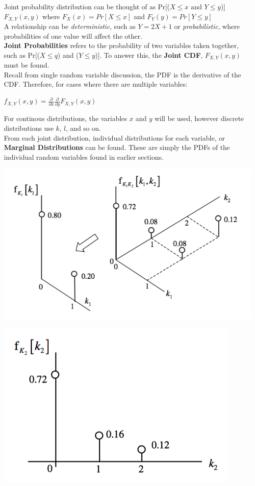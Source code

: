 \documentclass[11pt]{article}
\begin{document}
Joint probability distribution can be thought of as Pr[($X \leq x \text{ and } Y \leq y$)] \\ 

$F_{X,Y}(x,y)$ where $F_X(x) = Pr[X \leq x]$ and $F_Y(y) = Pr[Y \leq y]$ \\

A relationship can be \textit{deterministic}, such as $Y = 2X + 1$ or \textit{probabilistic}, where probabilities of one value will affect the other. \\

\textbf{Joint Probabilities} refers to the probability of two variables taken together, such as Pr[($X \leq q$) and ($Y \leq y$)]. To answer this, the \textbf{Joint CDF}, $F_{X,Y}(x,y)$ must be found. \\

Recall from single random variable discussion, the PDF is the derivative of the CDF. Therefore, for cases where there are multiple variables: \\

\begin{center}
    $f_{X,Y}(x,y) = \frac{\partial}{\partial x} \frac{\partial}{\partial y}F_{X,Y}(x,y)$ \\
\end{center}

For continous distributions, the variables $x$ and $y$ will be used, however discrete distributions use $k$, $l$, and so on. \\

From each joint distribution, individual distributions for each variable, or \textbf{Marginal Distributions} can be found. These are simply the PDFs of the individual random variables found in earlier sections.

\begin{center}
    \includegraphics[width=300 px]{img/marginal} \\
\end{center}

\begin{center}
    \includegraphics[width=300 px]{img/marginal2} \\
\end{center}
\end{document}
